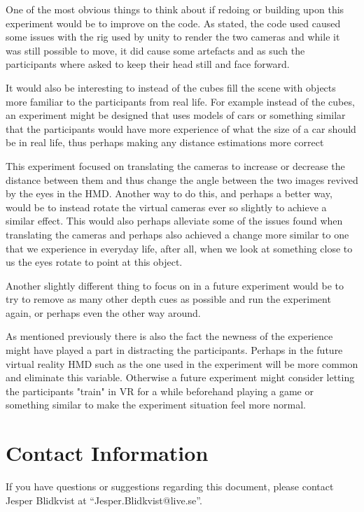 \documentclass[tog]{acmsiggraph}
\begin{document}
One of the most obvious things to think about if redoing or building upon this experiment would be to improve on the code. As stated, the code used caused some issues with the rig used by unity to render the two cameras and while it was still possible to move, it did cause some artefacts and as such the participants where asked to keep their head still and face forward.

It would also be interesting to instead of the cubes fill the scene with objects more familiar to the participants from real life. For example instead of the cubes, an experiment might be designed that uses models of cars or something similar that the participants would have more experience of what the size of a car should be in real life, thus perhaps making any distance estimations more correct 

This experiment focused on translating the cameras to increase or decrease the distance between them and thus change the angle between the two images revived by the eyes in the HMD. Another way to do this, and perhaps a better way, would be to instead rotate the virtual cameras ever so slightly to achieve a similar effect. This would also perhaps alleviate some of the issues found when translating the cameras and perhaps also achieved a change more similar to one that we experience in everyday life, after all, when we look at something close to us the eyes rotate to point at this object.

Another slightly different thing to focus on in a future experiment would be to try to remove as many other depth cues as possible and run the experiment again, or perhaps even the other way around. 

As mentioned previously there is also the fact the newness of the experience might have played a part in distracting the participants. Perhaps in the future virtual reality HMD such as the one used in the experiment will be more common and eliminate this variable. Otherwise a future experiment might consider letting the participants "train" in VR for a while beforehand playing a game or something similar to make the experiment situation feel more normal.

\section{Contact Information}

If you have questions or suggestions regarding this document, please
contact Jesper Blidkvist at ``Jesper.Blidkvist@live.se''.



\nocite{*}

\end{document}
